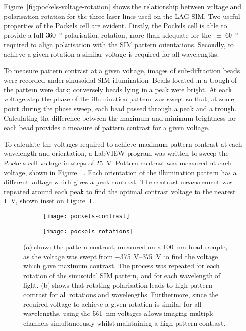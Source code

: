Figure~\ref{fig:pockels-voltage-rotation} shows the relationship between voltage and polarisation rotation for the three laser lines used on the LAG SIM. 
Two useful properties of the Pockels cell are evident. 
Firstly, the Pockels cell is able to provide a full \SI{360}{\degree} polarisation rotation, more than adequate for the \SI{\pm60}{\degree} required to align polarisation with the SIM pattern orientations. 
Secondly, to achieve a given rotation a similar voltage is required for all wavelengths. 

To measure pattern contrast at a given voltage, images of sub-diffraction beads were recorded under sinusoidal SIM illumination. 
Beads located in a trough of the pattern were dark; conversely beads lying in a peak were bright. 
At each voltage step the phase of the illumination pattern was swept so that, at some point during the phase sweep, each bead passed through a peak and a trough. 
Calculating the difference between the maximum and minimum brightness for each bead provides a measure of pattern contrast for a given voltage. 

To calculate the voltages required to achieve maximum pattern contrast at each wavelength and orientation, a LabVIEW program was written to sweep the Pockels cell voltage in steps of \SI{25}{\volt}. 
Pattern contrast was measured at each voltage, shown in Figure~\ref{fig:pockels-contrast}. 
Each orientation of the illumination pattern has a different voltage which gives a peak contrast. 
The contrast measurement was repeated around each peak to find the optimal contrast voltage to the nearest \SI{1}{\volt}, shown inset on Figure~\ref{fig:pockels-contrast}. 

\begin{figure}[htbp!] 
\centering
\begin{subfigure}[b]{\textwidth}
	\texttt{[image: pockels-contrast]}
	\caption{}\label{fig:pockels-contrast}
\end{subfigure}
\begin{subfigure}[b]{\textwidth}
	\texttt{[image: pockels-rotations]}
	\caption{}\label{fig:pockels-optimal}
\end{subfigure}
\caption[LAG SIM: Measurements of a bead sample reveal the ideal Pockels cell voltages for maximum pattern contrast]{(a) shows the pattern contrast, measured on a \SI{100}{\nano\metre} bead sample, as the voltage was swept from \SIrange{-375}{375}{\volt} to find the voltage which gave maximum contrast. The process was repeated for each rotation of the sinusoidal SIM pattern, and for each wavelength of light. (b) shows that rotating polarisation leads to high pattern contrast for all rotations and wavelengths. Furthermore, since the required voltage to achieve a given rotation is similar for all wavelengths, using the \SI{561}{\nano\metre} voltages allows imaging multiple channels simultaneously whilst maintaining a high pattern contrast.}
\label{fig:pockels-contrast-figures}
\end{figure} 


